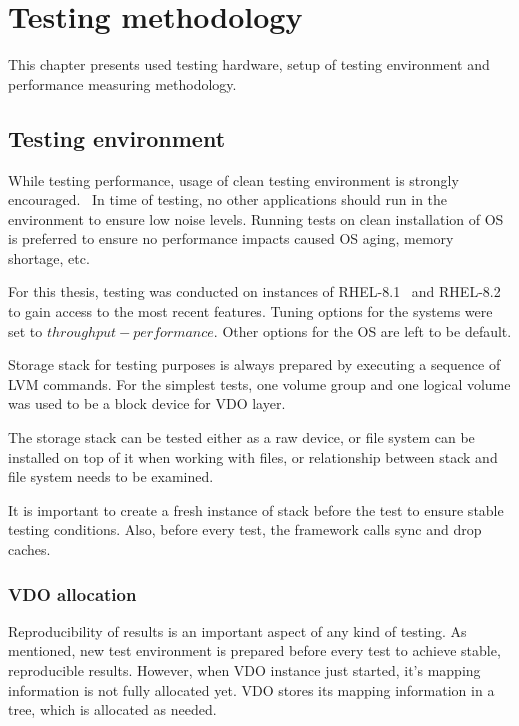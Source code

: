 \documentclass[
  color, %
  table, %
  lof,   %
  lot,   %
]{fithesis3}
\begin{document}


\chapter{Testing methodology}
\label{methodology}
This chapter presents used testing hardware, setup of testing environment and performance measuring methodology.


\section{Testing environment}
While testing performance, usage of clean testing environment is strongly encouraged.~\cite{Traeger:2008:NYS:1367829.1367831} In time of testing, no other applications should run in the environment to ensure low noise levels. Running tests on clean installation of OS is preferred to ensure no performance impacts caused OS aging, memory shortage, etc.

For this thesis, testing was conducted on instances of RHEL-8.1~\cite{notes:rhel81} and RHEL-8.2~\cite{notes:rhel82} to gain access to the most recent features. Tuning options for the systems were set to $throughput-performance$. Other options for the OS are left to be default.

Storage stack for testing purposes is always prepared by executing a sequence of LVM commands. For the simplest tests, one volume group and one logical volume was used to be a block device for VDO layer.

The storage stack can be tested either as a raw device, or file system can be installed on top of it when working with files, or relationship between stack and file system needs to be examined.

It is important to create a fresh instance of stack before the test to ensure stable testing conditions. Also, before every test, the framework calls sync and drop caches. 

\subsection{VDO allocation}
\label{alloc}
Reproducibility of results is an important aspect of any kind of testing. As mentioned, new test environment is prepared before every test to achieve stable, reproducible results. However, when VDO instance just started, it's mapping information is not fully allocated yet. VDO stores its mapping information in a tree, which is allocated as needed.
\end{document}
